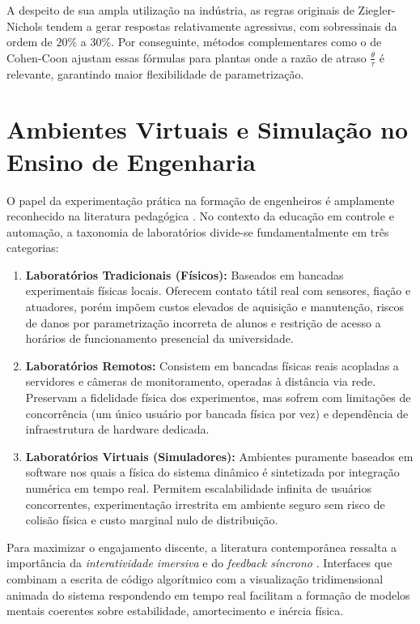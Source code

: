 A despeito de sua ampla utilização na indústria, as regras originais de Ziegler-Nichols tendem a gerar respostas relativamente agressivas, com sobressinais da ordem de $20\%$ a $30\%$. Por conseguinte, métodos complementares como o de Cohen-Coon \cite{cohen1953} ajustam essas fórmulas para plantas onde a razão de atraso $\frac{\theta}{\tau}$ é relevante, garantindo maior flexibilidade de parametrização.

\section{Ambientes Virtuais e Simulação no Ensino de Engenharia}
\label{sec:laboratorios_virtuais}

O papel da experimentação prática na formação de engenheiros é amplamente reconhecido na literatura pedagógica \cite{dormido2002, gomes2019}. No contexto da educação em controle e automação, a taxonomia de laboratórios divide-se fundamentalmente em três categorias:

\begin{enumerate}
    \item \textbf{Laboratórios Tradicionais (Físicos):} Baseados em bancadas experimentais físicas locais. Oferecem contato tátil real com sensores, fiação e atuadores, porém impõem custos elevados de aquisição e manutenção, riscos de danos por parametrização incorreta de alunos e restrição de acesso a horários de funcionamento presencial da universidade.
    \item \textbf{Laboratórios Remotos:} Consistem em bancadas físicas reais acopladas a servidores e câmeras de monitoramento, operadas à distância via rede. Preservam a fidelidade física dos experimentos, mas sofrem com limitações de concorrência (um único usuário por bancada física por vez) e dependência de infraestrutura de hardware dedicada.
    \item \textbf{Laboratórios Virtuais (Simuladores):} Ambientes puramente baseados em software nos quais a física do sistema dinâmico é sintetizada por integração numérica em tempo real. Permitem escalabilidade infinita de usuários concorrentes, experimentação irrestrita em ambiente seguro sem risco de colisão física e custo marginal nulo de distribuição.
\end{enumerate}

Para maximizar o engajamento discente, a literatura contemporânea ressalta a importância da \textit{interatividade imersiva} e do \textit{feedback síncrono} \cite{dormido2002}. Interfaces que combinam a escrita de código algorítmico com a visualização tridimensional animada do sistema respondendo em tempo real facilitam a formação de modelos mentais coerentes sobre estabilidade, amortecimento e inércia física.

